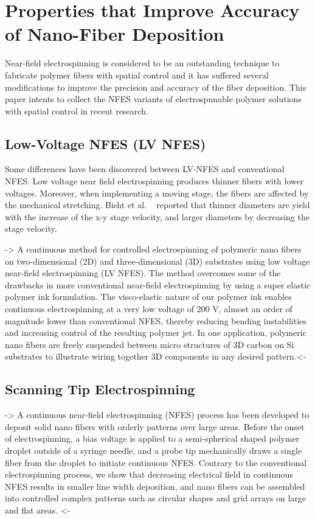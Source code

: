 \documentclass[5p,,preprint,12pt,twocolumn]{elsarticle}
\begin{document}
    
\section{Properties that Improve Accuracy of Nano-Fiber Deposition}
Near-field electrospinning is considered to be an outstanding technique to fabricate polymer fibers with spatial control and it has suffered several modifications to improve the precision and accuracy of the fiber deposition. This paper intents to collect the NFES variants of electrospunable polymer solutions with spatial control in recent research.



\subsection{Low-Voltage NFES (LV NFES) \unskip~\protect\cite{527120:11973130}}Some differences have been discovered between LV-NFES and conventional NFES. Low voltage near field electrospinning produces thinner fibers with lower voltages. Moreover, when implementing a moving stage, the fibers are affected by the mechanical stretching. Bisht et al. \unskip~\cite{527120:11973130} reported that thinner diameters are yield with the increase of the x-y stage velocity, and larger diameters by decreasing the stage velocity.

-{\textgreater} A continuous method for controlled electrospinning of polymeric nano fibers on two-dimensional (2D) and three-dimensional (3D) substrates using low voltage near-field electrospinning (LV NFES). The method overcomes some of the drawbacks in more conventional near-field electrospinning by using a super elastic polymer ink formulation. The visco-elastic nature of our polymer ink enables continuous electrospinning at a very low voltage of 200 V, almost an order of magnitude lower than conventional NFES, thereby reducing bending instabilities and increasing control of the resulting polymer jet. In one application, polymeric nano fibers are freely suspended between micro structures of 3D carbon on Si substrates to illustrate wiring together 3D components in any desired pattern.{\textless}-



\subsection{Scanning Tip Electrospinning \unskip~\protect\cite{527120:11974306}}-{\textgreater} A continuous near-field electrospinning (NFES) process has been developed to deposit solid nano fibers with orderly patterns over large areas. Before the onset of electrospinning, a bias voltage is applied to a semi-spherical shaped polymer droplet outside of a syringe needle, and a probe tip mechanically draws a single fiber from the droplet to initiate continuous NFES. Contrary to the conventional electrospinning process, we show that decreasing electrical field in continuous NFES results in smaller line width deposition, and nano fibers can be assembled into controlled complex patterns such as circular shapes and grid arrays on large and flat areas. {\textless}-
\end{document}
